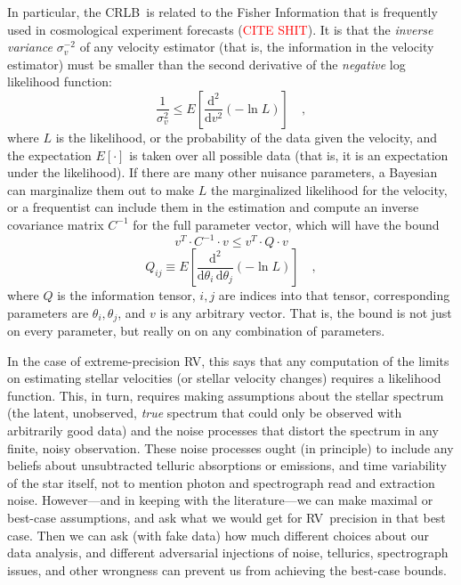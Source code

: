 \documentclass[modern]{aastex62}
\newcommand{\dd}{\mathrm{d}}
\newcommand{\todo}[1]{\textcolor{red}{#1}}  %
\newcommand{\acronym}[1]{{\small{#1}}}
\newcommand{\RV}{\acronym{RV}}
\newcommand{\CRLB}{\acronym{CRLB}}
\begin{document}
In particular, the \CRLB\ is related to the Fisher Information that is
frequently used in cosmological experiment forecasts (\todo{CITE
  SHIT}).
It is that the \emph{inverse variance} $\sigma_v^{-2}$ of any velocity
estimator (that is, the information in the velocity estimator) must be smaller than the
second derivative of the \emph{negative} log likelihood function:
\begin{equation}
\frac{1}{\sigma_v^2} \leq E\left[\frac{\dd^2}{\dd v^2}(-\ln L)\right] \quad,
\end{equation}
where $L$ is the likelihood, or the probability of the data given the velocity,
and the expectation $E[\cdot]$ is taken over all possible data (that is, it is an
expectation under the likelihood).
If there are many other nuisance parameters, a Bayesian can marginalize them
out to make $L$ the marginalized likelihood for the velocity, or a frequentist
can include them in the estimation and compute an inverse covariance matrix $C^{-1}$
for the full parameter vector, which will have the bound
\begin{equation}
v^T\cdot C^{-1}\cdot v \leq v^T\cdot Q\cdot v
\end{equation}
\begin{equation}
Q_{ij} \equiv E\left[\frac{\dd^2}{\dd\theta_i\,\dd\theta_j}(-\ln L)\right] \quad,
\end{equation}
where $Q$ is the information tensor, $i,j$ are indices into that
tensor, corresponding parameters are $\theta_i, \theta_j$, and $v$ is
any arbitrary vector.  That is, the bound is not just on every
parameter, but really on on any combination of parameters.

In the case of extreme-precision \RV, this says that any computation of the limits
on estimating stellar velocities (or stellar velocity changes)
requires a likelihood function.
This, in turn, requires making assumptions about the stellar spectrum (the
latent, unobserved, \emph{true} spectrum that could only be observed
with arbitrarily good data) and the noise processes that distort the
spectrum in any finite, noisy observation.
These noise processes ought (in principle) to include any beliefs about
unsubtracted telluric absorptions or emissions, and time variability
of the star itself, not to mention photon and spectrograph read and
extraction noise.
However---and in keeping with the literature---we can make maximal or
best-case assumptions, and ask what we would get for \RV\ precision
in that best case.
Then we can ask (with fake data) how much different choices about our
data analysis, and different adversarial injections of noise,
tellurics, spectrograph issues, and other wrongness can prevent us
from achieving the best-case bounds.
\end{document}
